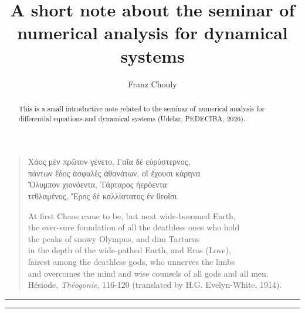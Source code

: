 \documentclass[11pt]{article}
\title{\color{deepblue} \textbf{A short note about the seminar of numerical analysis for dynamical systems}}
\author{Franz Chouly}
\begin{document}
\maketitle

\begin{quote}
    \begin{otherlanguage}{greek}
Χάος μὲν πρῶτον γένετο, Γαῖα δὲ εὐρύστερνος, \\
πάντων ἕδος ἀσφαλὲς ἀθανάτων, οἳ ἔχουσι κάρηνα \\
Ὄλυμπον χιονόεντα, Τάρταρος ἠερόεντα \\
τεθλαμένος, Ἔρος δὲ καλλίστατος ἐν θεοῖσι.\\[1em]
\end{otherlanguage}
At first Chaos came to be, but next wide-bosomed Earth, \\
the ever-sure foundation of all the deathless ones who hold \\
the peaks of snowy Olympus, and dim Tartarus \\
in the depth of the wide-pathed Earth, and Eros (Love), \\
fairest among the deathless gods, who unnerves the limbs \\
and overcomes the mind and wise counsels of all gods and all men.\\[1em]
Hésiode, \textit{Théogonie}, 116-120 (translated by H.G. Evelyn-White, 1914).
\end{quote}

\vspace{1em}


\begin{abstract}
This is a small introductive note related to the seminar of numerical analysis  for differential equations and dynamical systems (Udelar, PEDECIBA, 2026).
\end{abstract}

\vspace{0.5cm}
\hrule
\vspace{0.5cm}

\tableofcontents

\newpage

\vspace{0.5cm}
\hrule
\vspace{0.5cm}
\end{document}
